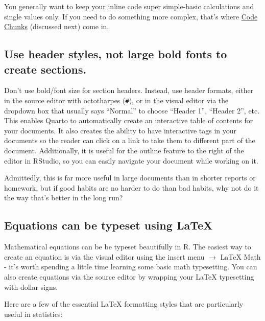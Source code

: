 \documentclass[
  letterpaper,
]{book}
\begin{document}
You generally want to keep your inline code super simple-basic
calculations and single values only. If you need to do something more
complex, that's where \hyperref[code-chunks]{Code Chunks} (discussed
next) come in.

\subsection{Use header styles, not large bold fonts to create
sections.}\label{use-header-styles-not-large-bold-fonts-to-create-sections.}

Don't use bold/font size for section headers. Instead, use header
formats, either in the source editor with octotharpes (\texttt{\#}), or
in the visual editor via the dropdown box that usually says ``Normal''
to choose ``Header 1'', ``Header 2'', etc. This enables Quarto to
automatically create an interactive table of contents for your
documents. It also creates the ability to have interactive tags in your
documents so the reader can click on a link to take them to different
part of the document. Additionally, it is useful for the outline feature
to the right of the editor in RStudio, so you can easily navigate your
document while working on it.

Admittedly, this is far more useful in large documents than in shorter
reports or homework, but if good habits are no harder to do than bad
habits, why not do it the way that's better in the long run?

\subsection{Equations can be typeset using
LaTeX}\label{equations-can-be-typeset-using-latex}

Mathematical equations can be be typeset beautifully in R. The easiest
way to create an equation is via the visual editor using the insert menu
\(\rightarrow\) LaTeX Math - it's worth spending a little time learning
some basic math typesetting. You can also create equations via the
source editor by wrapping your LaTeX typesetting with dollar signs.

Here are a few of the essential LaTeX formatting styles that are
particularly useful in statistics:
\end{document}
